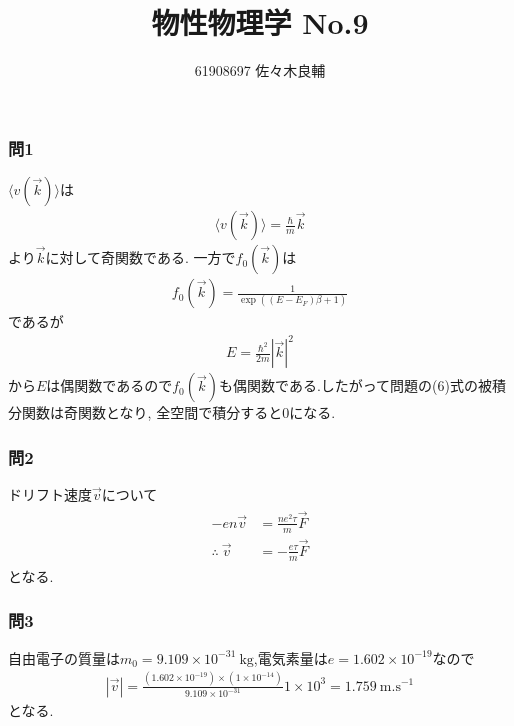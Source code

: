 \documentclass[uplatex,a4j,11pt,dvipdfmx]{jsarticle}
\begin{document}
\title{物性物理学 No.9}
\author{61908697 佐々木良輔}
\date{}
\maketitle
\subsubsection*{問1}
$\langle v(\vec{k})\rangle$は
\begin{align}
  \langle v(\vec{k})\rangle=\frac{\hbar}{m}\vec{k}
\end{align}
より$\vec{k}$に対して奇関数である.
一方で$f_0(\vec{k})$は
\begin{align}
  f_0(\vec{k})=\frac{1}{\exp((E-E_F)\beta+1)}
\end{align}
であるが
\begin{align}
  E=\frac{\hbar^2}{2m}|\vec{k}|^2
\end{align}
から$E$は偶関数であるので$f_0(\vec{k})$も偶関数である.したがって問題の(6)式の被積分関数は奇関数となり,
全空間で積分すると0になる.
\subsubsection*{問2}
ドリフト速度$\vec{v}$について
\begin{align}
  \begin{split}
    -en\vec{v}&=\frac{ne^2\tau}{m}\vec{F}\\
    \therefore\ \vec{v}&=-\frac{e\tau}{m}\vec{F}
  \end{split}
\end{align}
となる.
\subsubsection*{問3}
自由電子の質量は$m_0=9.109\times10^{-31}\ \si{\kilo\gram}$,電気素量は$e=1.602\times10^{-19}$なので
\begin{align}
  |\vec{v}|=\frac{(1.602\times10^{-19})\times(1\times10^{-14})}{9.109\times10^{-31}}1\times10^3=1.759\ \si{\metre.\second^{-1}}
\end{align}
となる.
\end{document}
